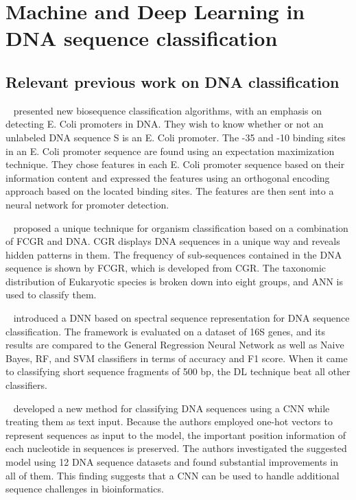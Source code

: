 \chapter{Machine and Deep Learning in DNA sequence classification} \label{sec:ml_dl_dna}

\section{Relevant previous work on DNA classification}\label{sec:previous_work}

\citeauthor{Ma2001DNAStudy}~\cite{Ma2001DNAStudy} presented new biosequence classification algorithms, with an emphasis on detecting E. Coli promoters in \gls{DNA}. They wish to know whether or not an unlabeled \gls{DNA} sequence S is an E. Coli promoter. The -35 and -10 binding sites in an E. Coli promoter sequence are found using an expectation maximization technique. They chose features in each E. Coli promoter sequence based on their information content and expressed the features using an orthogonal encoding approach based on the located binding sites. The features are then sent into a neural network for promoter detection.

\citeauthor{Nair2010ANNRepresentation}~\cite{Nair2010ANNRepresentation} proposed a unique technique for organism classification based on a combination of \gls{FCGR} and \gls{DNA}. \gls{CGR} displays \gls{DNA} sequences in a unique way and reveals hidden patterns in them. The frequency of sub-sequences contained in the \gls{DNA} sequence is shown by \gls{FCGR}, which is developed from \gls{CGR}. The taxonomic distribution of Eukaryotic species is broken down into eight groups, and \gls{ANN} is used to classify them.

\citeauthor{Rizzo2015AClassification}~\cite{Rizzo2015AClassification} introduced a \gls{DNN} based on spectral sequence representation for \gls{DNA} sequence classification. The framework is evaluated on a dataset of 16S genes, and its results are compared to the General Regression Neural Network as well as Naive Bayes, \gls{RF}, and \gls{SVM} classifiers in terms of accuracy and F1 score. When it came to classifying short sequence fragments of 500 bp, the \gls{DL} technique beat all other classifiers.

\citeauthor{Nguyen2016DNANetwork}~\cite{Nguyen2016DNANetwork} developed a new method for classifying \gls{DNA} sequences using a \gls{CNN} while treating them as text input. Because the authors employed one-hot vectors to represent sequences as input to the model, the important position information of each nucleotide in sequences is preserved. The authors investigated the suggested model using 12 \gls{DNA} sequence datasets and found substantial improvements in all of them. This finding suggests that a \gls{CNN} can be used to handle additional sequence challenges in bioinformatics.

